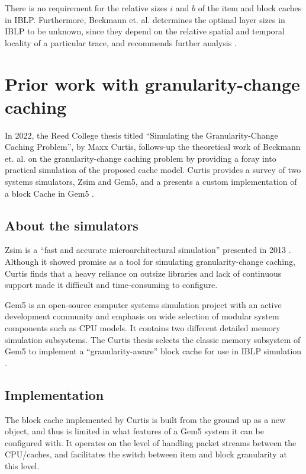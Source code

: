 \documentclass[12pt,twoside]{reedthesis}
\begin{document}
	There is no requirement for the relative sizes $i$ and $b$ of the item and block caches in IBLP. Furthermore, Beckmann et. al. determines the optimal layer sizes in IBLP to be unknown, since they depend on the relative spatial and temporal locality of a particular trace, and recommends further analysis \cite{beckmann}.

\section{Prior work with granularity-change caching}

In 2022, the Reed College thesis titled ``Simulating the Granularity-Change Caching Problem'', by Maxx Curtis, follows-up the theoretical work of Beckmann et. al. on the granularity-change caching problem by providing a foray into practical simulation of the proposed cache model. Curtis provides a survey of two systems simulators, Zsim and Gem5, and a presents a custom implementation of a block Cache in Gem5 \cite{curtis}.

	\subsection*{About the simulators}

	Zsim is a ``fast and accurate microarchitectural simulation'' presented in 2013 \cite{zsim}. Although it showed promise as a tool for simulating granularity-change caching, Curtis finds that a heavy reliance on outsize libraries and lack of continuous support made it difficult and time-consuming to configure.

	Gem5 is an open-source computer systems simulation project with an active development community and emphasis on wide selection of modular system components such as CPU models. It contains two different detailed memory simulation subsystems. The Curtis thesis selects the classic memory subsystem of Gem5 to implement a ``granularity-aware'' block cache for use in IBLP simulation \cite{curtis}.

	\subsection*{Implementation}

	The block cache implemented by Curtis is built from the ground up as a new object, and thus is limited in what features of a Gem5 system it can be configured with. It operates on the level of handling packet streams between the CPU/caches, and facilitates the switch between item and block granularity at this level.
\end{document}
